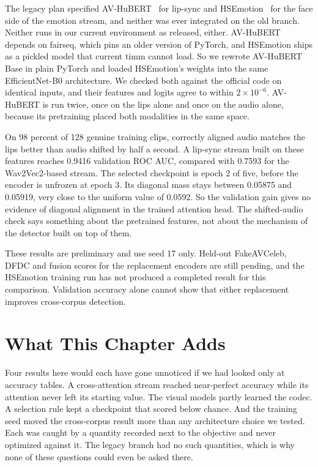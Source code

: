 The legacy plan specified AV-HuBERT~\cite{avhubert} for lip-sync and
HSEmotion~\cite{hsemotion} for the face side of the emotion stream, and neither
was ever integrated on the old branch. Neither runs in our current environment
as released, either. AV-HuBERT depends on fairseq, which pins an older version
of PyTorch, and HSEmotion ships as a pickled model that current timm cannot
load. So we rewrote AV-HuBERT Base in plain PyTorch and loaded HSEmotion's
weights into the same EfficientNet-B0 architecture. We checked both against the
official code on identical inputs, and their features and logits agree to
within $2\times10^{-6}$. AV-HuBERT is run twice, once on the lips alone and
once on the audio alone, because its pretraining placed both modalities in the
same space.

On 98 percent of 128 genuine training clips, correctly aligned audio matches
the lips better than audio shifted by half a second. A lip-sync stream built on
these features reaches 0.9416 validation ROC AUC, compared with 0.7593 for the
Wav2Vec2-based stream. The selected checkpoint is epoch 2 of five, before the
encoder is unfrozen at epoch 3. Its diagonal mass stays between 0.05875 and
0.05919, very close to the uniform value of 0.0592. So the validation gain gives
no evidence of diagonal alignment in the trained attention head. The
shifted-audio check says something about the pretrained features, not about the
mechanism of the detector built on top of them.

These results are preliminary and use seed 17 only. Held-out FakeAVCeleb, DFDC
and fusion scores for the replacement encoders are still pending, and the
HSEmotion training run has not produced a completed result for this
comparison. Validation accuracy alone cannot show that either replacement
improves cross-corpus detection.

\section{What This Chapter Adds}

Four results here would each have gone unnoticed if we had looked only at
accuracy tables. A cross-attention stream reached near-perfect accuracy while
its attention never left its starting value. The visual models partly learned
the codec. A selection rule kept a checkpoint that scored below chance. And the
training seed moved the cross-corpus result more than any architecture choice
we tested. Each was caught by a quantity recorded next to the objective and
never optimized against it. The legacy branch had no such quantities, which is
why none of these questions could even be asked there.

